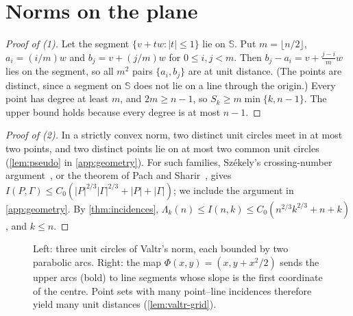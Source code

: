 \documentclass[anonymous,a4paper,USenglish,cleveref,autoref,thm-restate]{socg-lipics-v2021}
\newcommand{\Lam}{\Lambda}
\begin{document}
\section{Norms on the plane}
\label{sec:norms}

\norms*

\begin{proof}[Proof of (1)]
Let the segment $\{v+tw:|t|\le1\}$ lie on $\mathbb S$. Put $m=\lfloor n/2\rfloor$, $a_i=(i/m)w$ and $b_j=v+(j/m)w$ for $0\le i,j<m$. Then $b_j-a_i=v+\frac{j-i}{m}w$ lies on the segment, so all $m^2$ pairs $\{a_i,b_j\}$ are at unit distance. (The points are distinct, since a segment on $\mathbb S$ does not lie on a line through the origin.) Every point has degree at least $m$, and $2m\ge n-1$, so $S_k\ge m\min\{k,n-1\}$. The upper bound holds because every degree is at most $n-1$.
\end{proof}

\begin{proof}[Proof of (2)]
In a strictly convex norm, two distinct unit circles meet in at most two points, and two distinct points lie on at most two common unit circles (\cref{lem:pseudo} in \cref{app:geometry}). For such families, Sz\'ekely's crossing-number argument~\cite{Szekely97}, or the theorem of Pach and Sharir~\cite{PachSharir98}, gives $I(P,\Gamma)\le C_0(|P|^{2/3}|\Gamma|^{2/3}+|P|+|\Gamma|)$; we include the argument in \cref{app:geometry}. By \cref{thm:incidences}, $\Lam_k(n)\le I(n,k)\le C_0(n^{2/3}k^{2/3}+n+k)$, and $k\le n$.
\end{proof}


\begin{figure}[!t]
\centering
{}
\caption{Left: three unit circles of Valtr's norm, each bounded by two parabolic arcs. Right: the map $\Phi(x,y)=(x,y+x^2/2)$ sends the upper arcs (bold) to line segments whose slope is the first coordinate of the centre. Point sets with many point--line incidences therefore yield many unit distances (\cref{lem:valtr-grid}).}
\label{fig:valtr}
\end{figure}
\end{document}
